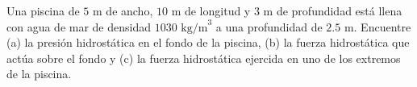 \item Una piscina de $5 \text{ m}$ de ancho, $10 \text{ m}$ de longitud y $3 \text{ m}$ de profundidad está llena con agua de mar de densidad $1030 \text{ kg/m}^3$ a una profundidad de $2.5 \text{ m}$. Encuentre (a) la presión hidrostática en el fondo de la piscina, (b) la fuerza hidrostática que actúa sobre el fondo y (c) la fuerza hidrostática ejercida en uno de los extremos de la piscina.
